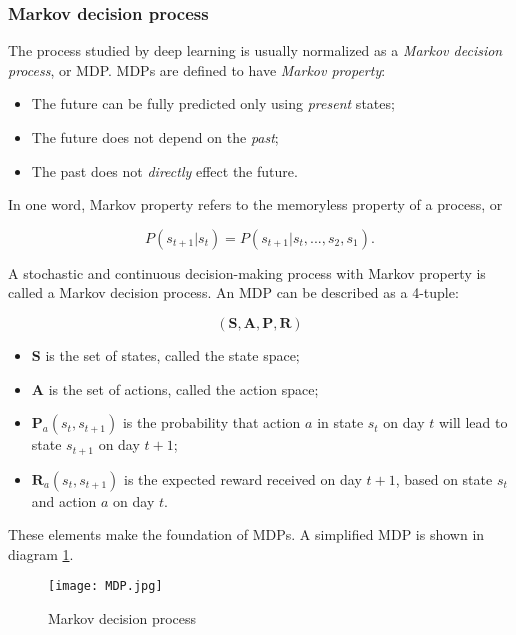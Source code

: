 \documentclass{mcmthesis}
\begin{document}
\subsubsection{Markov decision process}

 The process studied by deep learning is usually normalized as a \textit{Markov decision process}, or MDP.
MDPs are defined to have \textit{Markov property}:

\begin{itemize}
  \item The future can be fully predicted only using \textit{present} states;
  \item The future does not depend on the \textit{past};
  \item The past does not \textit{directly} effect the future.
\end{itemize}

In one word, Markov property refers to the memoryless property of a process, or

\begin{equation}
  P(s_{t+1}\vert s_t) = P(s_{t+1}\vert s_t,...,s_2,s_1).
\end{equation}

A stochastic and continuous decision-making process with Markov property
is called a Markov decision process.
An MDP can be described as a 4-tuple:

\begin{equation}
(\pmb{S},\pmb{A},\pmb{P},\pmb{R})
\end{equation}

\begin{itemize}
  \item $\pmb{S}$ is the set of states, called the state space;
  \item $\pmb{A}$ is the set of actions, called the action space;
  \item $\pmb{P}_a(s_t, s_{t+1})$ is the probability that action $a$ in state $s_t$ on day $t$ will lead to state $s_{t+1}$ on day $t+1$;
  \item $\pmb{R}_a(s_t, s_{t+1})$ is the expected reward received on day $t+1$, based on state $s_t$ and action $a$ on day $t$.
\end{itemize}

These elements make the foundation of MDPs.
A simplified MDP is shown in diagram \ref{MDP}.

\begin{figure}[h]
  \small
  \centering
  \texttt{[image: MDP.jpg]}
  \caption{Markov decision process} \label{MDP}
\end{figure}
\end{document}
